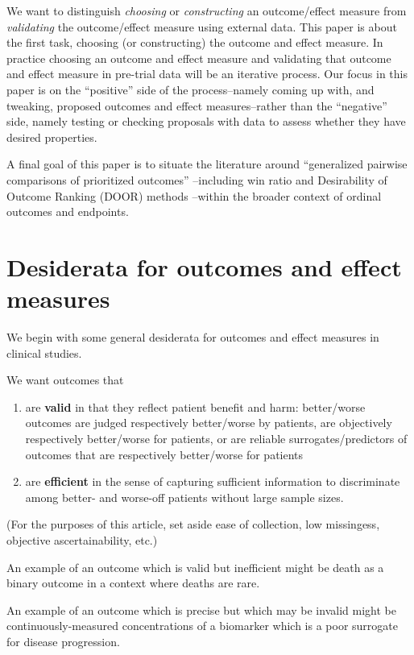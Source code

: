 \documentclass[
  11pt,
  fleqn
]{article}
\begin{document}
We want to distinguish \emph{choosing} or \emph{constructing} an outcome/effect
measure from \emph{validating} the outcome/effect measure using external data.
This paper is about the first task, choosing (or constructing) the outcome and
effect measure. In practice choosing an outcome and effect measure and
validating that outcome and effect measure in pre-trial data will be an
iterative process. Our focus in this paper is on the ``positive'' side of the
process--namely coming up with, and tweaking, proposed outcomes and effect
measures--rather than the ``negative'' side, namely testing or checking
proposals with data to assess whether they have desired properties.

A final goal of this paper is to situate the literature around ``generalized
pairwise comparisons of prioritized outcomes''
\citep{buyseGeneralizedPairwiseComparisons2022}--including win ratio
\citep{pocockWinRatioNew2012} and Desirability of Outcome Ranking (DOOR)
methods \citep{evansDesirabilityOutcomeRanking2015,
ongUnlockingDOORHow2023}--within the broader context of ordinal outcomes and
endpoints.

\section{Desiderata for outcomes and effect measures}

We begin with some general desiderata for outcomes and effect measures in
clinical studies.

We want outcomes that
\begin{enumerate}
  \item are \textbf{valid} in that they reflect patient benefit and harm:
    better/worse outcomes are judged respectively better/worse by patients, are
    objectively respectively better/worse for patients, or are reliable
    surrogates/predictors of outcomes that are respectively better/worse for
    patients
  \item are \textbf{efficient} in the sense of capturing
    sufficient information to
    discriminate among better- and worse-off patients without large
    sample sizes.
\end{enumerate}
(For the purposes of this article, set aside ease of collection, low
missingess, objective ascertainability, etc.)

An example of an outcome which is valid but inefficient might be
death as a binary outcome in a context where deaths
are rare.

An example of an outcome which is precise but which may be invalid
might be continuously-measured concentrations of a biomarker which is a poor
surrogate for disease progression.
\end{document}
